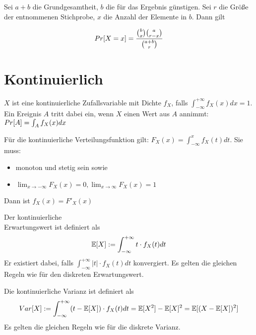 \begin{definition} 
	Sei $a+b$ die Grundgesamtheit, $b$ die für das Ergebnis günstigen. Sei $r$ die Größe der entnommenen Stichprobe, $x$ die Anzahl der Elemente in $b$. Dann gilt
	
	\begin{align*}
	 Pr[X = x] =	\frac{\binom{b}{x} \binom{a}{r-x} }{\binom{a + b}{r}}
	\end{align*}
	
\end{definition}

\pagebreak

\section{Kontinuierlich}

\begin{definition}
	$X$ ist eine kontinuierliche Zufallsvariable mit Dichte $f_X$, falls $\int_{- \infty}^{+ \infty} f_X(x) dx = 1$.
    Ein Ereignis $A$ tritt dabei ein, wenn $X$ einen Wert aus $A$ annimmt:
    $Pr[A] = \int_A f_X(x) dx$
\end{definition}

\begin{definition}
	Für die kontinuierliche Verteilungsfunktion gilt: $F_X(x) = \int_{- \infty}^x f_X(t)dt$. Sie muss:
	\begin{itemize} [noitemsep]
		\item monoton und stetig sein sowie
		\item $\lim_{x \rightarrow -\infty}F_X(x) = 0, \lim_{x \rightarrow \infty}F_X(x) = 1$
	\end{itemize}
	Dann ist $f_X(x) = F'_X(x)$
\end{definition}

\begin{definition}
	Der kontinuierliche \\ Erwartungswert ist definiert als 
	\begin{align*}
		\mathbb{E}[X] := \int_{- \infty}^{+ \infty} t \cdot f_X(t) dt
	\end{align*}
	Er existiert dabei, falls $ \int_{- \infty}^{+ \infty} |t| \cdot f_X(t) dt$ konvergiert. Es gelten die gleichen Regeln wie für den diskreten Erwartungswert.
\end{definition}

\begin{definition}
	Die kontinuierliche Varianz ist definiert als 
	\begin{align*}
	Var[X]:= \int_{- \infty}^{+ \infty} (t - \mathbb{E}[X]) \cdot f_X(t) dt = \mathbb{E}[X^2] - \mathbb{E}[X]^2 = \mathbb{E}[(X - \mathbb{E}[X])^2]
	\end{align*}
	Es gelten die gleichen Regeln wie für die diskrete Varianz.
\end{definition}	

